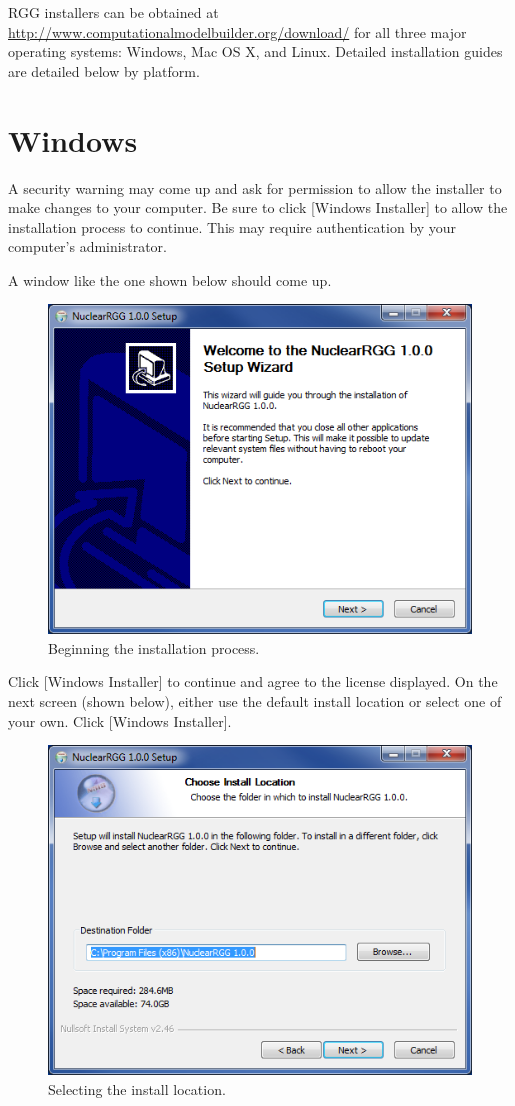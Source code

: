 RGG installers can be obtained at \url{http://www.computationalmodelbuilder.org/download/} for all three major operating systems: Windows, Mac OS X, and Linux.  Detailed installation guides are detailed below by platform.

\section{Windows}
A security warning may come up and ask for permission to allow the installer to make changes to your computer.  Be sure to click [Windows Installer] to allow the installation process to continue.  This may require authentication by your computer's administrator.

A window like the one shown below should come up.

\begin{figure}[H]
	\begin{center}
		\includegraphics[width=0.5\linewidth]{Images/windows-install-1.png}
		\caption{Beginning the installation process.}
		\label{fig:WindowsInstall1}
	\end{center}
\end{figure}

Click [Windows Installer] to continue and agree to the license displayed.  On the next screen (shown below), either use the default install location or select one of your own.  Click [Windows Installer].

\begin{figure}[H]
	\begin{center}
		\includegraphics[width=0.5\linewidth]{Images/windows-install-2.png}
		\caption{Selecting the install location.}
		\label{fig:WindowsInstall2}
	\end{center}
\end{figure}

